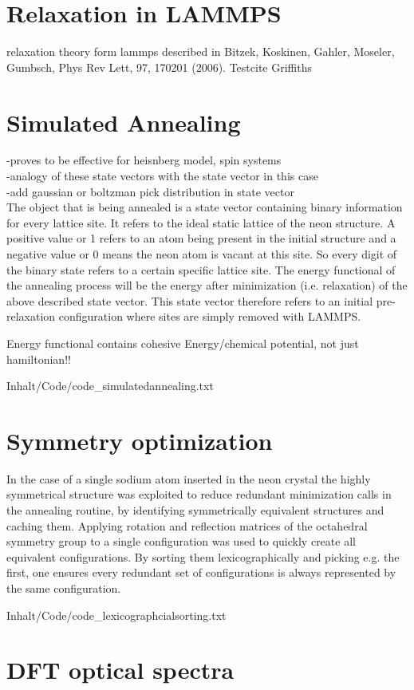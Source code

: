\section{Relaxation in LAMMPS}
relaxation theory form lammps 
described in \cite{Bitzek2006} Bitzek, Koskinen, Gahler, Moseler, Gumbsch, Phys Rev Lett, 97, 170201 (2006).
Testcite Griffiths\cite{griffithsQM}
 
\section{Simulated Annealing}
-proves to be effective for heisnberg model, spin systems\\
-analogy of these state vectors with the state vector in this case\\
-add gaussian or boltzman pick distribution in state vector\\
The object that is being annealed is a state vector containing binary information for every lattice site. It refers to the ideal static lattice of the neon structure. A positive value or 1 refers to an atom being present in the initial structure and a negative value or 0 means the neon atom is vacant at this site. So every digit of the binary state refers to a certain specific lattice site. The energy functional of the annealing process will be the energy after minimization (i.e. relaxation) of the above described state vector. This state vector therefore refers to an initial pre-relaxation configuration where sites are simply removed with \ac{LAMMPS}.

Energy functional contains cohesive Energy/chemical potential, not just hamiltonian!!

{Inhalt/Code/code_simulatedannealing.txt}

\section{Symmetry optimization} 
In the case of a single sodium atom inserted in the neon crystal the highly symmetrical structure was exploited to reduce redundant minimization calls in the annealing routine, by identifying symmetrically equivalent structures and caching them. Applying rotation and reflection matrices of the octahedral symmetry group to a single configuration was used to quickly create all equivalent configurations. By sorting them lexicographically and picking e.g. the first, one ensures every redundant set of configurations is always represented by the same configuration.


{Inhalt/Code/code_lexicographcialsorting.txt} 

\section{DFT optical spectra}






%